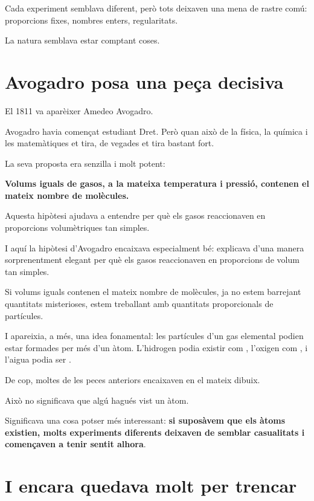 Cada experiment semblava diferent, però tots deixaven una mena de rastre comú: proporcions fixes, nombres enters, regularitats.

La natura semblava estar comptant coses.

\section{Avogadro posa una peça decisiva}

El 1811 va aparèixer Amedeo Avogadro.

Avogadro havia començat estudiant Dret. Però quan això de la física, la química i les matemàtiques et tira, de vegades et tira bastant fort.

La seva proposta era senzilla i molt potent:

\begin{center}
\textbf{Volums iguals de gasos, a la mateixa temperatura i pressió, contenen el mateix nombre de molècules.}
\end{center}

Aquesta hipòtesi ajudava a entendre per què els gasos reaccionaven en proporcions volumètriques tan simples.

I aquí la hipòtesi d’Avogadro encaixava especialment bé: explicava d’una manera sorprenentment elegant per què els gasos reaccionaven en proporcions de volum tan simples.

Si volums iguals contenen el mateix nombre de molècules, ja no estem barrejant quantitats misterioses, estem treballant amb quantitats proporcionals de partícules.

I apareixia, a més, una idea fonamental: les partícules d'un gas elemental podien estar formades per més d'un àtom. L'hidrogen podia existir com , l'oxigen com , i l'aigua podia ser .

De cop, moltes de les peces anteriors encaixaven en el mateix dibuix.

Això no significava que algú hagués vist un àtom.

Significava una cosa potser més interessant: \textbf{si suposàvem que els àtoms existien, molts experiments diferents deixaven de semblar casualitats i començaven a tenir sentit alhora}.

\vfill
\newpage


\section{I encara quedava molt per trencar}

